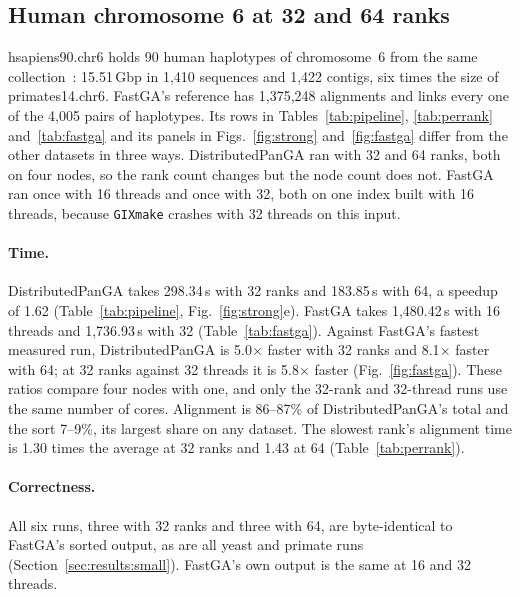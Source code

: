 \subsection{Human chromosome 6 at 32 and 64 ranks}\label{sec:results:human}

hsapiens90.chr6 holds 90 human haplotypes of chromosome~6 from the same
collection~\cite{pggbdata}: 15.51\,Gbp in 1,410 sequences and 1,422 contigs,
six times the size of primates14.chr6. FastGA's reference has 1,375,248
alignments and links every one of the 4,005 pairs of haplotypes. Its rows in
Tables~\ref{tab:pipeline}, \ref{tab:perrank} and~\ref{tab:fastga} and its panels in
Figs.~\ref{fig:strong} and~\ref{fig:fastga} differ from the other datasets
in three ways. DistributedPanGA ran with 32 and 64 ranks, both on four
nodes, so the rank count changes but the node count does not. FastGA ran
once with 16 threads and once with 32, both on one index built with 16
threads, because \texttt{GIXmake} crashes with 32 threads on this input.

\paragraph{Time.} DistributedPanGA takes 298.34\,s with 32 ranks and
183.85\,s with 64, a speedup of 1.62 (Table~\ref{tab:pipeline},
Fig.~\ref{fig:strong}e). FastGA takes 1,480.42\,s with 16 threads and
1,736.93\,s with 32 (Table~\ref{tab:fastga}). Against FastGA's fastest
measured run, DistributedPanGA is 5.0$\times$ faster with 32 ranks and
8.1$\times$ faster with 64; at 32 ranks against 32 threads it is
5.8$\times$ faster (Fig.~\ref{fig:fastga}). These ratios compare four nodes
with one, and only the 32-rank and 32-thread runs use the same number of
cores. Alignment is 86--87\% of DistributedPanGA's total and the sort
7--9\%, its largest share on any dataset. The slowest rank's alignment
time is 1.30 times the average at 32 ranks and 1.43 at 64
(Table~\ref{tab:perrank}).

\paragraph{Correctness.} All six runs, three with 32 ranks and three with
64, are byte-identical to FastGA's sorted output, as are all yeast and
primate runs (Section~\ref{sec:results:small}). FastGA's own output is the
same at 16 and 32 threads.
